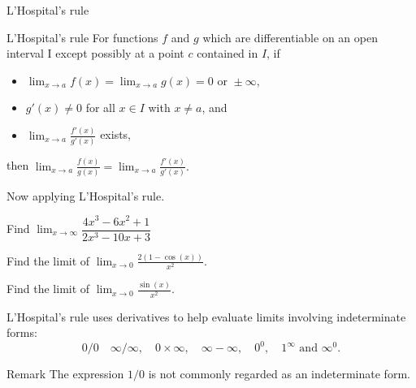 \begin{frame}{L'Hospital's rule}
\begin{mybox}{L'Hospital's rule}
For functions $f$ and $g$ which are differentiable on an open interval I except possibly at a point $c$ contained in $I$, if

\begin{itemize}
	\item ${\displaystyle \lim _{x\to a}f(x)=\lim _{x\to a}g(x)=0{\text{ or }}\pm \infty ,}  $ 
	\item $  {\displaystyle g'(x)\neq 0}$ for all $x\in I$  with $x\neq  a$, and
	\item $  \displaystyle  \lim _{x\to a}{\frac {f'(x)}{g'(x)} } $ 
	exists, 	
\end{itemize}
then \qquad 
$ \displaystyle \lim _{x\to a}{\frac {f(x)}{g(x)}}=\lim _{x\to a}{\frac {f'(x)}{g'(x)}}.$	
\end{mybox}
\end{frame}

\begin{frame}
Now applying  L'Hospital's rule. 

\begin{myexample}{}{}
Find $\lim_{x\rightarrow \infty} \dfrac{4x^3-6x^2+1}{2x^3 -10x +3}$	
\end{myexample}	
	
	
\end{frame}

\begin{frame}
\begin{myexample}{}{}
Find the limit of   $\displaystyle \lim_{x \to 0} \frac{2(1-\cos(x))}{x^2}$.	
\end{myexample}

		
	
\end{frame}


\begin{frame}
\begin{myexample}{}{}
	Find the limit of   $\displaystyle \lim_{x \to 0} \frac{\sin(x)}{x^2}$.		
\end{myexample} 
\end{frame}

\begin{frame}
	
L'Hospital's rule  uses derivatives to help evaluate limits involving indeterminate forms:
\[0/0 \quad \infty/\infty,  \quad  0\times \infty, \quad
\infty- \infty, \quad 0^0,\quad 1^\infty \text{ and } \infty^0.\]


\begin{mybox}{Remark}{}
	The expression $1/0$ is not commonly regarded as an indeterminate form.
\end{mybox}	
	
\end{frame}

